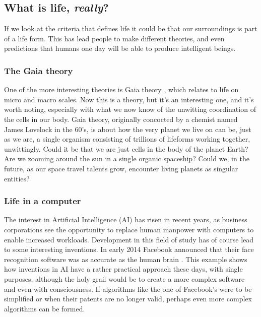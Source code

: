 \subsection*{What is life, \textit{really}?}

If we look at the criteria that defines life it could be that our surroundings is part of a life form.
This has lead people to make different theories, and even predictions that humans one day will be able to produce intelligent beings.

\subsubsection*{The Gaia theory}
One of the more interesting theories is Gaia theory \cite{Lovelock}, which relates to life on micro and macro scales. Now this is a theory, but it's an interesting one, and it's worth noting, especially with what we now know of the unwitting coordination of the cells in our body.
Gaia theory, originally concocted by a chemist named James Lovelock in the 60's, is about how the very planet we live on can be, just as we are, a single organism consisting of trillions of lifeforms working together, unwittingly.
Could it be that we are just cells in the body of the planet Earth?
Are we zooming around the sun in a single organic spaceship?
Could we, in the future, as our space travel talents grow, encounter living planets as singular entities?


\subsubsection*{Life in a computer}
The interest in Artificial Intelligence (AI) has risen in recent years, as business corporations see the opportunity to replace human manpower with computers to enable increased workloads.
Development in this field of study has of course lead to some interesting inventions.
In early 2014 Facebook announced that their face recognition software was as accurate as the human brain \cite{facebook}.
This example shows how inventions in AI have a rather practical approach these days, with single purposes, although the holy grail would be to create a more complex software and even with consciousness.
If algorithms like the one of Facebook's were to be simplified or when their patents are no longer valid, perhaps even more complex algorithms can be formed.

